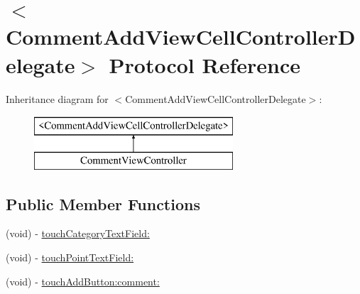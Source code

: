 \hypertarget{protocol_comment_add_view_cell_controller_delegate-p}{
\section{$<$CommentAddViewCellControllerDelegate$>$ Protocol Reference}
\label{protocol_comment_add_view_cell_controller_delegate-p}
}
Inheritance diagram for $<$CommentAddViewCellControllerDelegate$>$:\begin{figure}[H]
\begin{center}
\leavevmode
\includegraphics[height=2.000000cm]{protocol_comment_add_view_cell_controller_delegate-p}
\end{center}
\end{figure}
\subsection*{Public Member Functions}
\begin{DoxyCompactItemize}
\item 
(void) -\/ \hyperlink{protocol_comment_add_view_cell_controller_delegate-p_a99b92c3da0a67911729e9a41756d6209}{touchCategoryTextField:}
\item 
(void) -\/ \hyperlink{protocol_comment_add_view_cell_controller_delegate-p_ad611678a62d6024c3c189451295fc1d9}{touchPointTextField:}
\item 
(void) -\/ \hyperlink{protocol_comment_add_view_cell_controller_delegate-p_a5775deda3eb701abe8821b4425ae1f3c}{touchAddButton:comment:}
\end{DoxyCompactItemize}


